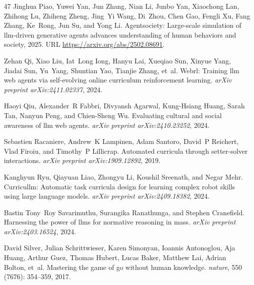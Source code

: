 \begin{thebibliography}{47}
Jinghua Piao, Yuwei Yan, Jun Zhang, Nian Li, Junbo Yan, Xiaochong Lan, Zhihong Lu, Zhiheng Zheng, Jing~Yi Wang, Di~Zhou, Chen Gao, Fengli Xu, Fang Zhang, Ke~Rong, Jun Su, and Yong Li.
\newblock Agentsociety: Large-scale simulation of llm-driven generative agents advances understanding of human behaviors and society, 2025{}.
\newblock URL \url{https://arxiv.org/abs/2502.08691}.

Zehan Qi, Xiao Liu, Iat~Long Iong, Hanyu Lai, Xueqiao Sun, Xinyue Yang, Jiadai Sun, Yu~Yang, Shuntian Yao, Tianjie Zhang, et~al.
\newblock Webrl: Training llm web agents via self-evolving online curriculum reinforcement learning.
\newblock \emph{arXiv preprint arXiv:2411.02337}, 2024.

Haoyi Qiu, Alexander~R Fabbri, Divyansh Agarwal, Kung-Hsiang Huang, Sarah Tan, Nanyun Peng, and Chien-Sheng Wu.
\newblock Evaluating cultural and social awareness of llm web agents.
\newblock \emph{arXiv preprint arXiv:2410.23252}, 2024.

Sebastien Racaniere, Andrew~K Lampinen, Adam Santoro, David~P Reichert, Vlad Firoiu, and Timothy~P Lillicrap.
\newblock Automated curricula through setter-solver interactions.
\newblock \emph{arXiv preprint arXiv:1909.12892}, 2019.

Kanghyun Ryu, Qiayuan Liao, Zhongyu Li, Koushil Sreenath, and Negar Mehr.
\newblock Curricullm: Automatic task curricula design for learning complex robot skills using large language models.
\newblock \emph{arXiv preprint arXiv:2409.18382}, 2024.

Bastin Tony~Roy Savarimuthu, Surangika Ranathunga, and Stephen Cranefield.
\newblock Harnessing the power of llms for normative reasoning in mass.
\newblock \emph{arXiv preprint arXiv:2403.16524}, 2024.

David Silver, Julian Schrittwieser, Karen Simonyan, Ioannis Antonoglou, Aja Huang, Arthur Guez, Thomas Hubert, Lucas Baker, Matthew Lai, Adrian Bolton, et~al.
\newblock Mastering the game of go without human knowledge.
\newblock \emph{nature}, 550 (7676): 354--359, 2017.


\end{thebibliography}
